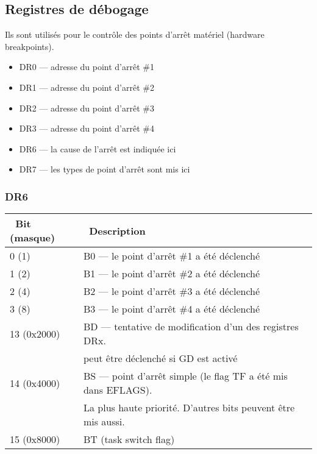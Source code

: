 \subsection{Registres de débogage}

Ils sont utilisés pour le contrôle des points d'arrêt matériel (hardware breakpoints).

\begin{itemize}
	\item DR0 --- adresse du point d'arrêt \#1
	\item DR1 --- adresse du point d'arrêt \#2
	\item DR2 --- adresse du point d'arrêt \#3
	\item DR3 --- adresse du point d'arrêt \#4
	\item DR6 --- la cause de l'arrêt est indiquée ici
	\item DR7 --- les types de point d'arrêt sont mis ici
\end{itemize}

\subsubsection{DR6}

\begin{center}
\begin{tabular}{ | l | l | }
\hline
\headercolor\ Bit (masque) &
\headercolor\ Description \\
\hline
0 (1)       &  B0 --- le point d'arrêt \#1 a été déclenché \\
\hline
1 (2)       &  B1 --- le point d'arrêt \#2 a été déclenché \\
\hline
2 (4)       &  B2 --- le point d'arrêt \#3 a été déclenché \\
\hline
3 (8)       &  B3 --- le point d'arrêt \#4 a été déclenché \\
\hline
13 (0x2000) &  BD --- tentative de modification d'un des registres DRx.\\
            &  peut être déclenché si GD est activé \\
\hline
14 (0x4000) &  BS --- point d'arrêt simple (le flag TF a été mis dans EFLAGS). \\
	    &  La plus haute priorité. D'autres bits peuvent être mis aussi. \\
\hline
15 (0x8000) &  BT (task switch flag) \\
\hline
\end{tabular}
\end{center}

